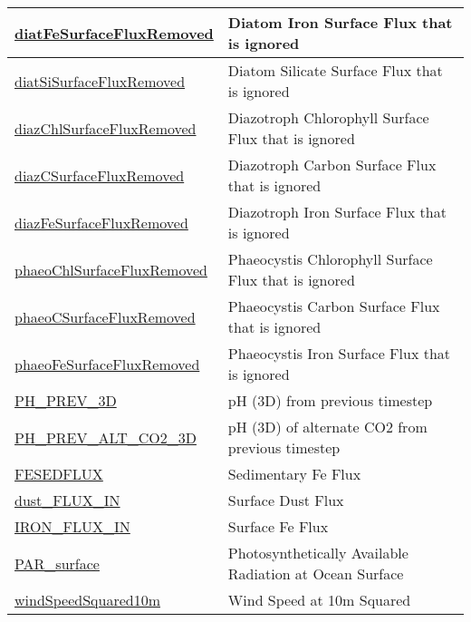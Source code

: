 {\begin{center}
\begin{longtable}{| p{2.0in} | p{4.0in} |}
    \hline
    \hyperref[subsec:var_sec_forcing_diatFeSurfaceFluxRemoved]{diatFeSurfaceFluxRemoved} & Diatom Iron Surface Flux that is ignored \\
    \hline
    \hyperref[subsec:var_sec_forcing_diatSiSurfaceFluxRemoved]{diatSiSurfaceFluxRemoved} & Diatom Silicate Surface Flux that is ignored \\
    \hline
    \hyperref[subsec:var_sec_forcing_diazChlSurfaceFluxRemoved]{diazChlSurfaceFluxRemoved} & Diazotroph Chlorophyll Surface Flux that is ignored \\
    \hline
    \hyperref[subsec:var_sec_forcing_diazCSurfaceFluxRemoved]{diazCSurfaceFluxRemoved} & Diazotroph Carbon Surface Flux that is ignored \\
    \hline
    \hyperref[subsec:var_sec_forcing_diazFeSurfaceFluxRemoved]{diazFeSurfaceFluxRemoved} & Diazotroph Iron Surface Flux that is ignored \\
    \hline
    \hyperref[subsec:var_sec_forcing_phaeoChlSurfaceFluxRemoved]{phaeoChlSurfaceFluxRemoved} & Phaeocystis Chlorophyll Surface Flux that is ignored \\
    \hline
    \hyperref[subsec:var_sec_forcing_phaeoCSurfaceFluxRemoved]{phaeoCSurfaceFluxRemoved} & Phaeocystis Carbon Surface Flux that is ignored \\
    \hline
    \hyperref[subsec:var_sec_forcing_phaeoFeSurfaceFluxRemoved]{phaeoFeSurfaceFluxRemoved} & Phaeocystis Iron Surface Flux that is ignored \\
    \hline
    \hyperref[subsec:var_sec_forcing_PH_PREV_3D]{PH\_PREV\_3D} & pH (3D) from previous timestep \\
    \hline
    \hyperref[subsec:var_sec_forcing_PH_PREV_ALT_CO2_3D]{PH\_PREV\_ALT\_CO2\_3D} & pH (3D) of alternate CO2 from previous timestep \\
    \hline
    \hyperref[subsec:var_sec_forcing_FESEDFLUX]{FESEDFLUX} & Sedimentary Fe Flux \\
    \hline
    \hyperref[subsec:var_sec_forcing_dust_FLUX_IN]{dust\_FLUX\_IN} & Surface Dust Flux \\
    \hline
    \hyperref[subsec:var_sec_forcing_IRON_FLUX_IN]{IRON\_FLUX\_IN} & Surface Fe Flux \\
    \hline
    \hyperref[subsec:var_sec_forcing_PAR_surface]{PAR\_surface} & Photosynthetically Available Radiation at Ocean Surface \\
    \hline
    \hyperref[subsec:var_sec_forcing_windSpeedSquared10m]{windSpeedSquared10m} & Wind Speed at 10m Squared \\

\end{longtable}
\end{center}}
